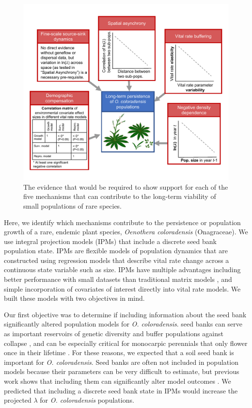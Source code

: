 \documentclass[12pt, letterpaper]{article}
\begin{document}
\begin{figure}[h]
  \centering
  \includegraphics[width=1\textwidth]{COBP_conceptualDiagram.pdf}
  \caption{The evidence that would be required to show support for each of the five mechanisms that can contribute to the long-term viability of small populations of rare species.}
  \label{fig:conceptualFigure}
\end{figure} 

Here, we identify which mechanisms contribute to the persistence or population growth of a rare, endemic plant species, \textit{Oenothera coloradensis} (Onagraceae). We use integral projection models (IPMs) \cite{Easterling2000} that include a discrete seed bank population state. IPMs are flexible models of population dynamics that are constructed using regression models that describe vital rate change across a continuous state variable such as size. IPMs have multiple advantages including better performance with small datasets than traditional matrix models \cite{Ramula2009IntegralHerbs}, and simple incorporation of covariates of interest directly into vital rate models. We built these models with two objectives in mind.

Our first objective was to determine if including information about the seed bank significantly altered population models for \textit{O. coloradensis}. seed banks can serve as important reservoirs of genetic diversity and buffer populations against collapse \cite{Vitalis2004WhenPerenniality, Jongejans2006WhatRange}, and can be especially critical for monocarpic perennials that only flower once in their lifetime \cite{Rees2006}. For these reasons, we expected that a soil seed bank is important for \textit{O. coloradensis}. Seed banks are often not included in population models because their parameters can be very difficult to estimate, but previous work shows that including them can significantly alter model outcomes \cite{Paniw2017, Nguyen2019ConsequencesModels}. We predicted that including a discrete seed bank state in IPMs would increase the projected $\lambda$ for \textit{O. coloradensis} populations. 
\end{document}
